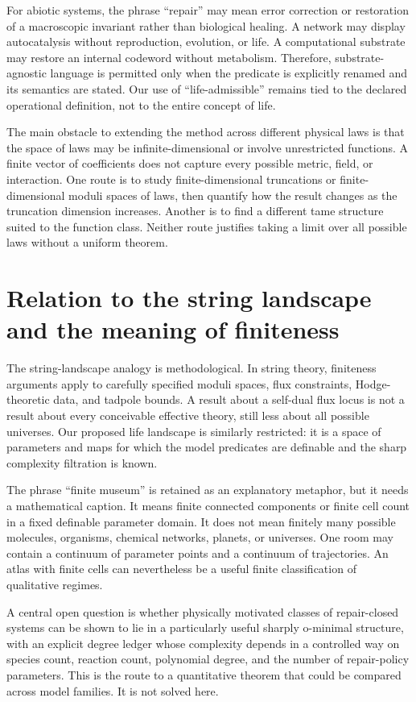 \documentclass[11pt,a4paper]{article}
\theoremstyle{definition}
\theoremstyle{remark}
\begin{document}
For abiotic systems, the phrase ``repair'' may mean error correction or restoration of a macroscopic invariant rather than biological healing. A network may display autocatalysis without reproduction, evolution, or life. A computational substrate may restore an internal codeword without metabolism. Therefore, substrate-agnostic language is permitted only when the predicate is explicitly renamed and its semantics are stated. Our use of ``life-admissible'' remains tied to the declared operational definition, not to the entire concept of life.

The main obstacle to extending the method across different physical laws is that the space of laws may be infinite-dimensional or involve unrestricted functions. A finite vector of coefficients does not capture every possible metric, field, or interaction. One route is to study finite-dimensional truncations or finite-dimensional moduli spaces of laws, then quantify how the result changes as the truncation dimension increases. Another is to find a different tame structure suited to the function class. Neither route justifies taking a limit over all possible laws without a uniform theorem.


\section{Relation to the string landscape and the meaning of finiteness}
The string-landscape analogy is methodological. In string theory, finiteness arguments apply to carefully specified moduli spaces, flux constraints, Hodge-theoretic data, and tadpole bounds. A result about a self-dual flux locus is not a result about every conceivable effective theory, still less about all possible universes. Our proposed life landscape is similarly restricted: it is a space of parameters and maps for which the model predicates are definable and the sharp complexity filtration is known.

The phrase ``finite museum'' is retained as an explanatory metaphor, but it needs a mathematical caption. It means finite connected components or finite cell count in a fixed definable parameter domain. It does not mean finitely many possible molecules, organisms, chemical networks, planets, or universes. One room may contain a continuum of parameter points and a continuum of trajectories. An atlas with finite cells can nevertheless be a useful finite classification of qualitative regimes.

A central open question is whether physically motivated classes of repair-closed systems can be shown to lie in a particularly useful sharply o-minimal structure, with an explicit degree ledger whose complexity depends in a controlled way on species count, reaction count, polynomial degree, and the number of repair-policy parameters. This is the route to a quantitative theorem that could be compared across model families. It is not solved here.
\end{document}
